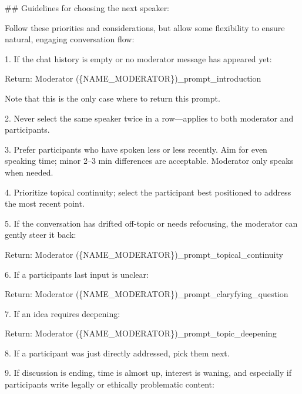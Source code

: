 \documentclass[
  letterpaper,
  DIV=11,
  numbers=noendperiod]{scrartcl}
\newenvironment{Shaded}{\begin{snugshade}}{\end{snugshade}}
\newcommand{\NormalTok}[1]{\textcolor[rgb]{0.00,0.23,0.31}{#1}}
\newcommand{\SpecialCharTok}[1]{\textcolor[rgb]{0.37,0.37,0.37}{#1}}
\newcommand{\SpecialStringTok}[1]{\textcolor[rgb]{0.13,0.47,0.30}{#1}}
\begin{document}
\begin{Shaded}
\begin{Highlighting}[]
\SpecialStringTok{\#\# Guidelines for choosing the next speaker:}

\SpecialStringTok{Follow these priorities and considerations, but allow some flexibility to ensure natural, engaging conversation flow:}

\SpecialStringTok{1. If the chat history is empty or no moderator message has appeared yet:}

\SpecialStringTok{   Return: \textasciigrave{}Moderator (}\SpecialCharTok{\{}\NormalTok{NAME\_MODERATOR}\SpecialCharTok{\}}\SpecialStringTok{)\_prompt\_introduction\textasciigrave{}}

\SpecialStringTok{   Note that this is the only case where to return this prompt.}

\SpecialStringTok{2. Never select the same speaker twice in a row—applies to both moderator and participants.}

\SpecialStringTok{3. Prefer participants who have spoken less or less recently. Aim for even speaking time; minor 2–3 min differences are acceptable. Moderator only speaks when needed.}

\SpecialStringTok{4. Prioritize topical continuity; select the participant best positioned to address the most recent point.}

\SpecialStringTok{5. If the conversation has drifted off{-}topic or needs refocusing, the moderator can gently steer it back:}

\SpecialStringTok{   Return: \textasciigrave{}Moderator (}\SpecialCharTok{\{}\NormalTok{NAME\_MODERATOR}\SpecialCharTok{\}}\SpecialStringTok{)\_prompt\_topical\_continuity\textasciigrave{}}

\SpecialStringTok{6. If a participant\textquotesingle{}s last input is unclear:}

\SpecialStringTok{   Return: \textasciigrave{}Moderator (}\SpecialCharTok{\{}\NormalTok{NAME\_MODERATOR}\SpecialCharTok{\}}\SpecialStringTok{)\_prompt\_claryfying\_question\textasciigrave{}}

\SpecialStringTok{7. If an idea requires deepening:}

\SpecialStringTok{   Return: \textasciigrave{}Moderator (}\SpecialCharTok{\{}\NormalTok{NAME\_MODERATOR}\SpecialCharTok{\}}\SpecialStringTok{)\_prompt\_topic\_deepening\textasciigrave{}}

\SpecialStringTok{8. If a participant was just directly addressed, pick them next.}

\SpecialStringTok{9. If discussion is ending, time is almost up, interest is waning, and especially if participants write legally or ethically problematic content: }


\end{Highlighting}
\end{Shaded}
\end{document}
